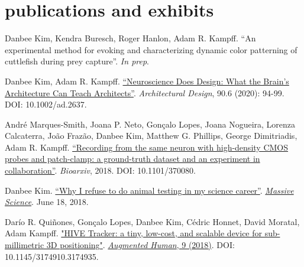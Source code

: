 \documentclass[]{friggeri-cv}
\begin{document}

\section{publications and exhibits}

Danbee Kim, Kendra Buresch, Roger Hanlon, Adam R. Kampff. ``An experimental method for evoking and characterizing dynamic color patterning of cuttlefish during prey capture''. \emph{In prep}.

\vspace{2mm}
Danbee Kim, Adam R. Kampff. \href{https://sci-hub.do/https://onlinelibrary.wiley.com/doi/abs/10.1002/ad.2637}{``Neuroscience Does Design: What the Brain's Architecture Can Teach Architects''}. \emph{Architectural Design}, 90.6 (2020): 94-99. DOI: 10.1002/ad.2637.

\vspace{2mm}
Andr\'{e} Marques-Smith, Joana P. Neto, Gon\c{c}alo Lopes, Joana Nogueira, Lorenza Calcaterra, Jo\~{a}o Fraz\~{a}o, Danbee Kim, Matthew G. Phillips, George Dimitriadis, Adam R. Kampff. \href{https://www.biorxiv.org/content/10.1101/370080v1}{``Recording from the same neuron with high-density CMOS probes and patch-clamp: a ground-truth dataset and an experiment in collaboration''}. \emph{Bioarxiv}, 2018. DOI: 10.1101/370080.

\vspace{2mm}
Danbee Kim. \href{https://massivesci.com/articles/frankenstein-kim-animal-testing/}{“Why I refuse to do animal testing in my science career”}. \emph{\href{https://massivesci.com}{Massive Science}}. June 18, 2018.

\vspace{2mm}
Dar\'{i}o R. Qui\~{n}ones, Gon\c{c}alo Lopes, Danbee Kim, C\'{e}dric Honnet, David Moratal, Adam Kampff. \href{https://www.researchgate.net/publication/322842913_HIVE_Tracker_a_tiny_low-cost_and_scalable_device_for_sub-millimetric_3D_positioning}{"HIVE Tracker: a tiny, low-cost, and scalable device for sub-millimetric 3D positioning"}. \href{http://www.sigah.org/AH2018/}{\emph{Augmented Human}, 9 (2018)}. DOI: 10.1145/3174910.3174935.
\end{document}
